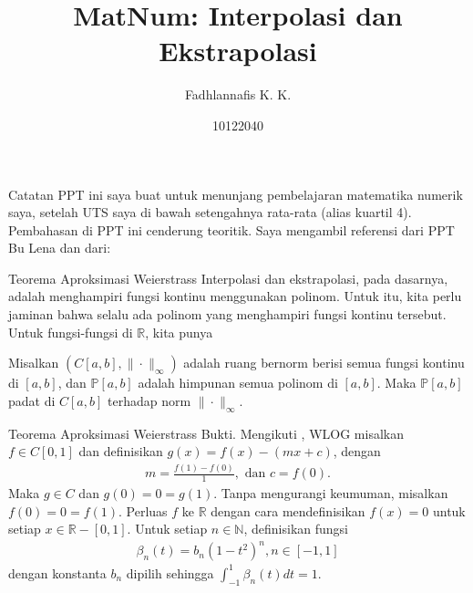 \documentclass[xcolor={dvipsnames}, 9pt]{beamer}
\title{MatNum: Interpolasi dan Ekstrapolasi}
\author{Fadhlannafis K. K.}
\date{10122040}
\begin{document}
	\begin{frame}[plain]
		\maketitle
	\end{frame}
	\begin{frame}{Catatan}
		PPT ini saya buat untuk menunjang pembelajaran matematika numerik saya, setelah UTS saya di bawah setengahnya rata-rata (alias kuartil 4). \newline
		Pembahasan di PPT ini cenderung teoritik. Saya mengambil referensi dari PPT Bu Lena dan dari:
		\nocite{*}
		\printbibliography
	\end{frame}
	\begin{frame}{Teorema Aproksimasi Weierstrass}
		Interpolasi dan ekstrapolasi, pada dasarnya, adalah menghampiri fungsi kontinu menggunakan polinom. \newline
		Untuk itu, kita perlu jaminan bahwa selalu ada polinom yang menghampiri fungsi kontinu tersebut. Untuk fungsi-fungsi di $\mathbb{R}$, kita punya \newline
		\begin{theorem}
			Misalkan $(C[a,b],\|\cdot\|_\infty)$ adalah ruang bernorm berisi semua fungsi kontinu di $[a,b]$, dan $\mathbb{P}[a,b]$ adalah himpunan semua polinom di $[a,b]$. Maka $\mathbb{P}[a,b]$ padat di $C[a,b]$ terhadap norm $\|\cdot\|_\infty$.
		\end{theorem}
	\end{frame}
	\begin{frame}{Teorema Aproksimasi Weierstrass}
		Bukti. Mengikuti \cite{Pugh2015Real}, WLOG misalkan $f\in C[0,1]$ dan definisikan $g(x)=f(x)-(mx+c)$, dengan
        \begin{align*}
            m=\frac{f(1)-f(0)}{1}, \text{ dan } c=f(0).
        \end{align*}
        Maka $g\in C$ dan $g(0)=0=g(1)$. Tanpa mengurangi keumuman, misalkan $f(0)=0=f(1)$. \newline
        Perluas $f$ ke $\mathbb{R}$ dengan cara mendefinisikan $f(x)=0$ untuk setiap $x\in\mathbb{R}-[0,1]$. Untuk setiap $n\in\mathbb{N}$, definisikan fungsi
        \begin{align*}
            \beta_n(t) = b_n(1-t^2)^n, n\in [-1,1]
        \end{align*}
        dengan konstanta $b_n$ dipilih sehingga $\int_{-1}^1 \beta_n(t)dt=1$.
	\end{frame}
\end{document}
